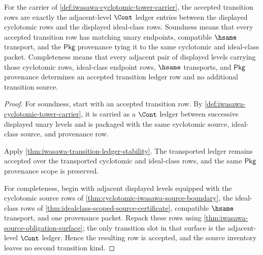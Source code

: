 \begin{theorem}
\label{thm:iwasawa-transition-ledger-exactness}
For the carrier of \autoref{def:iwasawa-cyclotomic-tower-carrier}, the accepted
transition rows are exactly the adjacent-level $\Cont$ ledger entries between
the displayed cyclotomic rows and the displayed ideal-class rows. Soundness
means that every accepted transition row has matching unary endpoints,
compatible $\hsame$ transport, and the $\mathsf{Pkg}$ provenance tying it to
the same cyclotomic and ideal-class packet. Completeness means that every
adjacent pair of displayed levels carrying those cyclotomic rows, ideal-class
endpoint rows, $\hsame$ transports, and $\mathsf{Pkg}$ provenance determines an
accepted transition ledger row and no additional transition source.
\end{theorem}
\begin{proof}
For soundness, start with an accepted transition row. By
\autoref{def:iwasawa-cyclotomic-tower-carrier}, it is carried as a $\Cont$
ledger between successive displayed unary levels and is packaged with the same
cyclotomic source, ideal-class source, and provenance row.

Apply \autoref{thm:iwasawa-transition-ledger-stability}. The transported ledger
remains accepted over the transported cyclotomic and ideal-class rows, and the
same $\mathsf{Pkg}$ provenance scope is preserved.

For completeness, begin with adjacent displayed levels equipped with the
cyclotomic source rows of
\autoref{thm:cyclotomic-iwasawa-source-boundary}, the ideal-class rows of
\autoref{thm:idealclass-scoped-source-certificate}, compatible $\hsame$
transport, and one provenance packet. Repack these rows using
\autoref{thm:iwasawa-source-obligation-surface}; the only transition slot in
that surface is the adjacent-level $\Cont$ ledger. Hence the resulting row is
accepted, and the source inventory leaves no second transition kind.
\end{proof}

